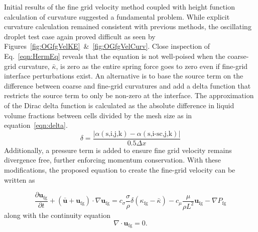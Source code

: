 Initial results of the fine grid velocity method coupled with height function calculation of curvature suggested a fundamental problem. While explicit curvature calculation remained consistent with previous methods, the oscillating droplet test case again proved difficult as seen by Figures~\ref{fig:OGfgVelKE}~\&~\ref{fig:OGfgVelCurv}. Close inspection of Eq.~\ref{eqn:HermEq} reveals that the equation is not well-poised when the coarse-grid curvature, $\bar{\kappa}$, is zero as the entire spring force goes to zero even if fine-grid interface perturbations exist.  An alternative is to base the source term on the difference between coarse and fine-grid curvatures and add a delta function that restricts the source term to only be non-zero at the interface.  The approximation of the Dirac delta function is calculated as the absolute difference in liquid volume fractions between cells divided by the mesh size as in equation~\ref{eqn:delta}.
\begin{equation}
\delta = \frac{|\alpha(\text{s,i,j,k}) - \alpha(\text{s,i-sc,j,k}) | }{0.5 \Delta x}
\label{eqn:delta}
\end{equation}
 Additionally, a pressure term is added to ensure fine grid velocity remains divergence free, further enforcing momentum conservation. With these modifications, the proposed equation to create the fine-grid velocity can be written as

\begin{equation}
\frac{\partial \bm{u}_{\text{fg}}}{\partial t} +
(\bar{\bm{u}}+\bm{u}_{\text{fg}}) \cdot \nabla \bm{u}_{\text{fg}} = 
c_{\sigma}\frac{\sigma}{\rho}\delta(\kappa_{\text{fg}}-\bar{\kappa})- 
c_{\mu}\frac{\mu}{\rho L^2}\bm{u}_{\text{fg}} -
\nabla P_{\text{fg}}\nonumber
\label{eqn:MyEq}
\end{equation}
along with the continuity equation
\begin{equation}
\nabla\cdot\bm{u}_\text{fg}=0.
\end{equation}


